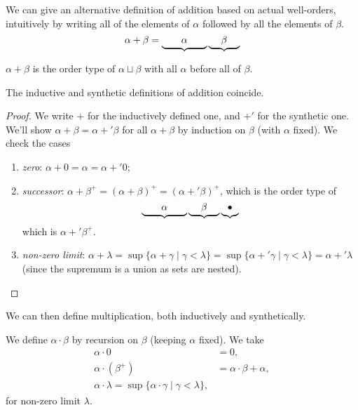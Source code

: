 \documentclass[a4paper, 10pt, twocolumn]{amsart}
\begin{document}
We can give an alternative definition of addition based on actual well-orders, intuitively by writing all of the elements of $\alpha$ followed by all the elements of $\beta$.
\[
  \alpha + \beta = \underbrace{\quad\quad\vphantom{\beta}\alpha\vphantom{\beta}\quad\quad}\underbrace{\quad\;\beta\;\quad}
\]
\begin{definition}
  $\alpha + \beta$ is the order type of $\alpha \sqcup \beta$ with all $\alpha$ before all of $\beta$.
\end{definition}

\begin{proposition}
  The inductive and synthetic definitions of addition coincide.
\end{proposition}
\begin{proof}
We write $+$ for the inductively defined one, and $+'$ for the synthetic one. We'll show $\alpha + \beta = \alpha +' \beta$ for all $\alpha + \beta$ by induction on $\beta$ (with $\alpha$ fixed). We check the cases
\begin{enumerate}
  \item \emph{zero}: $\alpha + 0 = \alpha = \alpha +' 0$;
  \item \emph{successor}: $\alpha + \beta^+ = (\alpha + \beta)^+ = (\alpha +' \beta)^+$, which is the order type of 
  $$
  \underbrace{\quad\quad\vphantom{\beta}\alpha\vphantom{\beta}\quad\quad}\underbrace{\quad\;\beta\;\quad}
  \underbrace{\vphantom{\beta}\bullet\vphantom{\beta}}
  $$ 
  which is $\alpha +' \beta^+$.
  \item \emph{non-zero limit}: $\alpha + \lambda = \sup\{\alpha + \gamma \mid \gamma < \lambda\} = \sup\{\alpha +' \gamma \mid \gamma < \lambda\} = \alpha +' \lambda$ (since the supremum is a union as sets are nested).
\end{enumerate}\vspace{-1pc}
\end{proof}

We can then define multiplication, both inductively and synthetically.

\begin{definition}
  We define $\alpha \cdot \beta$ by recursion on $\beta$ (keeping $\alpha$ fixed). We take
  \begin{align*}
    \alpha \cdot 0 &= 0, \\
    \alpha \cdot (\beta^+) &= \alpha \cdot \beta + \alpha, \\
    \alpha \cdot \lambda = \sup \{\alpha \cdot \gamma \mid \gamma < \lambda\},
  \end{align*} 
  for non-zero limit $\lambda$.
\end{definition}
\end{document}
